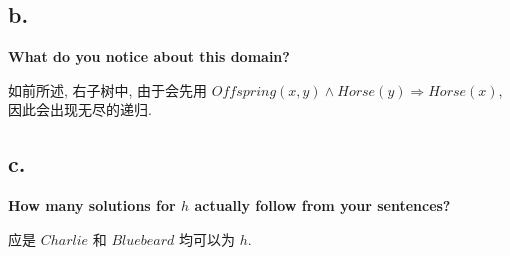 \documentclass[UTF8]{article}
\newcommand{\jumpLine} {\hspace*{\fill} \par}
\begin{document}
\subsection*{b.}
\noindent \textbf{What do you notice about this domain?}\\\jumpLine\noindent
如前所述, 右子树中, 由于会先用 $Offspring(x,y)\land Horse(y)\Rightarrow Horse(x)$, 因此会出现无尽的递归.
\subsection*{c.}
\noindent \textbf{How many solutions for $h$ actually follow from your sentences? }\\\jumpLine\noindent
应是 $Charlie$ 和 $Bluebeard$ 均可以为 $h$.
\end{document}
